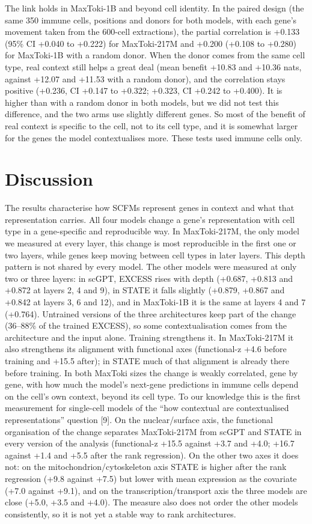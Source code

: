 \documentclass[
  11pt,
]{article}
\begin{document}
The link holds in MaxToki-1B and beyond cell identity. In the paired
design (the same 350 immune cells, positions and donors for both models,
with each gene's movement taken from the 600-cell extractions), the
partial correlation is +0.133 (95\% CI +0.040 to +0.222) for
MaxToki-217M and +0.200 (+0.108 to +0.280) for MaxToki-1B with a random
donor. When the donor comes from the same cell type, real context still
helps a great deal (mean benefit +10.83 and +10.36 nats, against +12.07
and +11.53 with a random donor), and the correlation stays positive
(+0.236, CI +0.147 to +0.322; +0.323, CI +0.242 to +0.400). It is higher
than with a random donor in both models, but we did not test this
difference, and the two arms use slightly different genes. So most of
the benefit of real context is specific to the cell, not to its cell
type, and it is somewhat larger for the genes the model contextualises
more. These tests used immune cells only.

\section{Discussion}\label{discussion}

The results characterise how SCFMs represent genes in context and what
that representation carries. All four models change a gene's
representation with cell type in a gene-specific and reproducible way.
In MaxToki-217M, the only model we measured at every layer, this change
is most reproducible in the first one or two layers, while genes keep
moving between cell types in later layers. This depth pattern is not
shared by every model. The other models were measured at only two or
three layers: in scGPT, EXCESS rises with depth (+0.687, +0.813 and
+0.872 at layers 2, 4 and 9), in STATE it falls slightly (+0.879, +0.867
and +0.842 at layers 3, 6 and 12), and in MaxToki-1B it is the same at
layers 4 and 7 (+0.764). Untrained versions of the three architectures
keep part of the change (36--88\% of the trained EXCESS), so some
contextualisation comes from the architecture and the input alone.
Training strengthens it. In MaxToki-217M it also strengthens its
alignment with functional axes (functional-z +4.6 before training and
+15.5 after); in STATE much of that alignment is already there before
training. In both MaxToki sizes the change is weakly correlated, gene by
gene, with how much the model's next-gene predictions in immune cells
depend on the cell's own context, beyond its cell type. To our knowledge
this is the first measurement for single-cell models of the ``how
contextual are contextualised representations'' question {[}9{]}. On the
nuclear/surface axis, the functional organisation of the change
separates MaxToki-217M from scGPT and STATE in every version of the
analysis (functional-z +15.5 against +3.7 and +4.0; +16.7 against +1.4
and +5.5 after the rank regression). On the other two axes it does not:
on the mitochondrion/cytoskeleton axis STATE is higher after the rank
regression (+9.8 against +7.5) but lower with mean expression as the
covariate (+7.0 against +9.1), and on the transcription/transport axis
the three models are close (+5.0, +3.5 and +4.0). The measure also does
not order the other models consistently, so it is not yet a stable way
to rank architectures.
\end{document}
